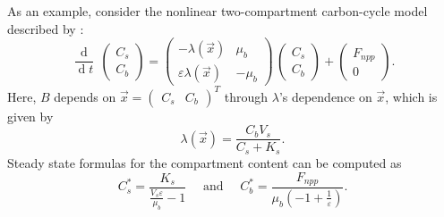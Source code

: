 \documentclass[smallextended]{svjour3}
\newcommand{\E}{\mathbb{E}}
\newcommand{\deriv}[1]{\frac{\operatorname{d}}{\operatorname{d}#1}}
\begin{document}
As an example, consider the nonlinear two-compartment carbon-cycle model described by \citet{Wang2014BG}:
\begin{equation*}
    \deriv{t}\,\left(\begin{matrix}C_{s}\\C_{b}\end{matrix}\right) = \left(\begin{matrix}- \lambda(\vec{x}) & \mu_{b}\\\varepsilon \lambda(\vec{x}) & - \mu_{b}\end{matrix}\right) \, \left(\begin{matrix}C_{s}\\C_{b}\end{matrix}\right) + \left(\begin{matrix}F_{npp}\\0\end{matrix}\right).
\end{equation*}
Here, $B$ depends on $\vec{x}=\left(\begin{matrix}C_{s} & C_{b}\end{matrix}\right)^T$ through $\lambda$'s dependence on $\vec{x}$, which is given by
\begin{equation}\label{eqn:lambdax}
    \lambda(\vec{x}) = \frac{C_{b} V_{s}}{C_{s} + K_{s}}.
\end{equation}
Steady state formulas for the compartment content can be computed as
\[
    C_s^\ast = \frac{K_{s}}{\frac{V_{s} \varepsilon}{\mu_{b}} - 1}\quad\text{ and }\quad C_b^\ast = \frac{F_{npp}}{\mu_{b} \left(-1 + \frac{1}{\varepsilon}\right)}.
\]
\end{document}
